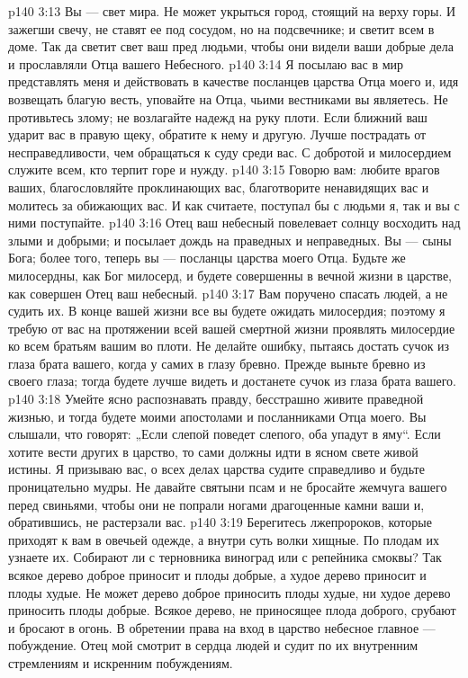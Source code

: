 \vs p140 3:13 Вы --- свет мира. Не может укрыться город, стоящий на верху горы. И зажегши свечу, не ставят ее под сосудом, но на подсвечнике; и светит всем в доме. Так да светит свет ваш пред людьми, чтобы они видели ваши добрые дела и прославляли Отца вашего Небесного.
\vs p140 3:14 Я посылаю вас в мир представлять меня и действовать в качестве посланцев царства Отца моего и, идя возвещать благую весть, уповайте на Отца, чьими вестниками вы являетесь. Не противьтесь злому; не возлагайте надежд на руку плоти. Если ближний ваш ударит вас в правую щеку, обратите к нему и другую. Лучше пострадать от несправедливости, чем обращаться к суду среди вас. С добротой и милосердием служите всем, кто терпит горе и нужду.
\vs p140 3:15 Говорю вам: любите врагов ваших, благословляйте проклинающих вас, благотворите ненавидящих вас и молитесь за обижающих вас. И как считаете, поступал бы с людьми я, так и вы с ними поступайте.
\vs p140 3:16 Отец ваш небесный повелевает солнцу восходить над злыми и добрыми; и посылает дождь на праведных и неправедных. Вы --- сыны Бога; более того, теперь вы --- посланцы царства моего Отца. Будьте же милосердны, как Бог милосерд, и будете совершенны в вечной жизни в царстве, как совершен Отец ваш небесный.
\vs p140 3:17 Вам поручено спасать людей, а не судить их. В конце вашей жизни все вы будете ожидать милосердия; поэтому я требую от вас на протяжении всей вашей смертной жизни проявлять милосердие ко всем братьям вашим во плоти. Не делайте ошибку, пытаясь достать сучок из глаза брата вашего, когда у самих в глазу бревно. Прежде выньте бревно из своего глаза; тогда будете лучше видеть и достанете сучок из глаза брата вашего.
\vs p140 3:18 Умейте ясно распознавать правду, бесстрашно живите праведной жизнью, и тогда будете моими апостолами и посланниками Отца моего. Вы слышали, что говорят: „Если слепой поведет слепого, оба упадут в яму“. Если хотите вести других в царство, то сами должны идти в ясном свете живой истины. Я призываю вас, о всех делах царства судите справедливо и будьте проницательно мудры. Не давайте святыни псам и не бросайте жемчуга вашего перед свиньями, чтобы они не попрали ногами драгоценные камни ваши и, обратившись, не растерзали вас.
\vs p140 3:19 Берегитесь лжепророков, которые приходят к вам в овечьей одежде, а внутри суть волки хищные. По плодам их узнаете их. Собирают ли с терновника виноград или с репейника смоквы? Так всякое дерево доброе приносит и плоды добрые, а худое дерево приносит и плоды худые. Не может дерево доброе приносить плоды худые, ни худое дерево приносить плоды добрые. Всякое дерево, не приносящее плода доброго, срубают и бросают в огонь. В обретении права на вход в царство небесное главное --- побуждение. Отец мой смотрит в сердца людей и судит по их внутренним стремлениям и искренним побуждениям.
